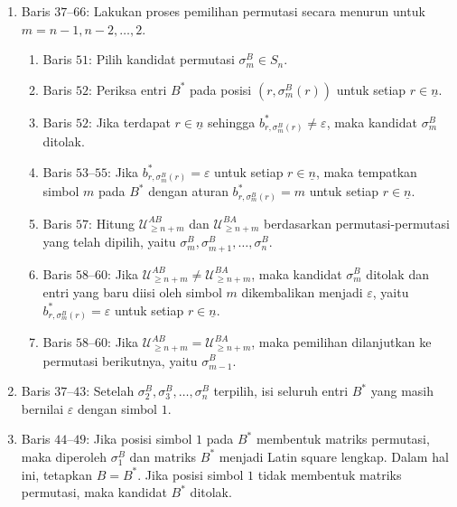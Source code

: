 \begin{algoritma}
\begin{enumerate}
    \item Baris $37$--$66$: Lakukan proses pemilihan permutasi secara menurun untuk $m=n-1,n-2,\ldots,2$.
          \begin{enumerate}
            \item Baris $51$: Pilih kandidat permutasi $\sigma_m^B\in S_n$.

            \item Baris $52$: Periksa entri $B^*$ pada posisi $(r,\sigma_m^B(r))$ untuk setiap $r\in \underline{n}$.

            \item Baris $52$: Jika terdapat $r\in \underline{n}$ sehingga $b^*_{r,\sigma_m^B(r)}\neq\varepsilon$, maka kandidat $\sigma_m^B$ ditolak.

            \item Baris $53$--$55$: Jika $b^*_{r,\sigma_m^B(r)}=\varepsilon$ untuk setiap $r\in \underline{n}$, maka tempatkan simbol $m$ pada $B^*$ dengan aturan
                  $b^*_{r,\sigma_m^B(r)}=m$ untuk setiap $r\in \underline{n}$.

            \item Baris $57$: Hitung $\mathcal{U}_{\ge n+m}^{AB}$ dan $\mathcal{U}_{\ge n+m}^{BA}$ berdasarkan permutasi-permutasi yang telah dipilih, yaitu $\sigma_m^B,\sigma_{m+1}^B,\ldots,\sigma_n^B$.

            \item Baris $58$--$60$: Jika $\mathcal{U}_{\ge n+m}^{AB}\neq\mathcal{U}_{\ge n+m}^{BA}$, maka kandidat $\sigma_m^B$ ditolak dan entri yang baru diisi oleh simbol $m$ dikembalikan menjadi $\varepsilon$, yaitu
                  $b^*_{r,\sigma_m^B(r)}=\varepsilon$ untuk setiap $r\in \underline{n}$.

            \item Baris $58$--$60$: Jika $\mathcal{U}_{\ge n+m}^{AB}=\mathcal{U}_{\ge n+m}^{BA}$, maka pemilihan dilanjutkan ke permutasi berikutnya, yaitu $\sigma_{m-1}^B$.
          \end{enumerate}

    \item Baris $37$--$43$: Setelah $\sigma_2^B,\sigma_3^B,\ldots,\sigma_n^B$ terpilih, isi seluruh entri $B^*$ yang masih bernilai $\varepsilon$ dengan simbol $1$.

    \item Baris $44$--$49$: Jika posisi simbol $1$ pada $B^*$ membentuk matriks permutasi, maka diperoleh $\sigma_1^B$ dan matriks $B^*$ menjadi Latin square lengkap. Dalam hal ini, tetapkan $B=B^*$. Jika posisi simbol $1$ tidak membentuk matriks permutasi, maka kandidat $B^*$ ditolak.


\end{enumerate}
\end{algoritma}
